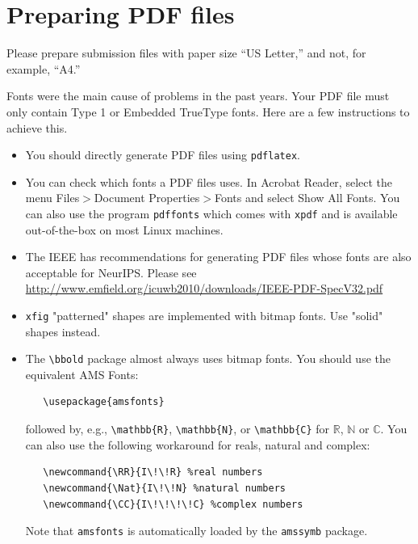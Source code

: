 \documentclass{article}
\begin{document}
\section{Preparing PDF files}


Please prepare submission files with paper size ``US Letter,'' and not, for
example, ``A4.''


Fonts were the main cause of problems in the past years. Your PDF file must only
contain Type 1 or Embedded TrueType fonts. Here are a few instructions to
achieve this.


\begin{itemize}


\item You should directly generate PDF files using \verb+pdflatex+.


\item You can check which fonts a PDF files uses.  In Acrobat Reader, select the
  menu Files$>$Document Properties$>$Fonts and select Show All Fonts. You can
  also use the program \verb+pdffonts+ which comes with \verb+xpdf+ and is
  available out-of-the-box on most Linux machines.


\item The IEEE has recommendations for generating PDF files whose fonts are also
  acceptable for NeurIPS. Please see
  \url{http://www.emfield.org/icuwb2010/downloads/IEEE-PDF-SpecV32.pdf}


\item \verb+xfig+ "patterned" shapes are implemented with bitmap fonts.  Use
  "solid" shapes instead.


\item The \verb+\bbold+ package almost always uses bitmap fonts.  You should use
  the equivalent AMS Fonts:
\begin{verbatim}
   \usepackage{amsfonts}
\end{verbatim}
followed by, e.g., \verb+\mathbb{R}+, \verb+\mathbb{N}+, or \verb+\mathbb{C}+
for $\mathbb{R}$, $\mathbb{N}$ or $\mathbb{C}$.  You can also use the following
workaround for reals, natural and complex:
\begin{verbatim}
   \newcommand{\RR}{I\!\!R} %real numbers
   \newcommand{\Nat}{I\!\!N} %natural numbers
   \newcommand{\CC}{I\!\!\!\!C} %complex numbers
\end{verbatim}
Note that \verb+amsfonts+ is automatically loaded by the \verb+amssymb+ package.


\end{itemize}
\end{document}
